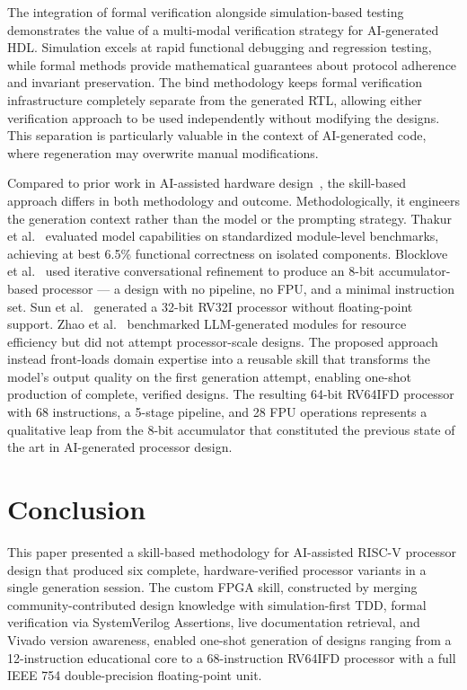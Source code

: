 \documentclass[journal]{IEEEtran}
\begin{document}
The integration of formal verification alongside simulation-based testing demonstrates the value of a multi-modal verification strategy for AI-generated HDL. Simulation excels at rapid functional debugging and regression testing, while formal methods provide mathematical guarantees about protocol adherence and invariant preservation. The bind methodology keeps formal verification infrastructure completely separate from the generated RTL, allowing either verification approach to be used independently without modifying the designs. This separation is particularly valuable in the context of AI-generated code, where regeneration may overwrite manual modifications.

Compared to prior work in AI-assisted hardware design~\cite{thakur2023date, blocklove2023chipchat, pearce2020dave, sun2024hdlgen, zhao2025resbench}, the skill-based approach differs in both methodology and outcome. Methodologically, it engineers the generation context rather than the model or the prompting strategy. Thakur et al.~\cite{thakur2023date} evaluated model capabilities on standardized module-level benchmarks, achieving at best 6.5\% functional correctness on isolated components. Blocklove et al.~\cite{blocklove2023chipchat} used iterative conversational refinement to produce an 8-bit accumulator-based processor --- a design with no pipeline, no FPU, and a minimal instruction set. Sun et al.~\cite{sun2024hdlgen} generated a 32-bit RV32I processor without floating-point support. Zhao et al.~\cite{zhao2025resbench} benchmarked LLM-generated modules for resource efficiency but did not attempt processor-scale designs. The proposed approach instead front-loads domain expertise into a reusable skill that transforms the model's output quality on the first generation attempt, enabling one-shot production of complete, verified designs. The resulting 64-bit RV64IFD processor with 68 instructions, a 5-stage pipeline, and 28 FPU operations represents a qualitative leap from the 8-bit accumulator that constituted the previous state of the art in AI-generated processor design.

\section{Conclusion}

This paper presented a skill-based methodology for AI-assisted RISC-V processor design that produced six complete, hardware-verified processor variants in a single generation session. The custom FPGA skill, constructed by merging community-contributed design knowledge with simulation-first TDD, formal verification via SystemVerilog Assertions, live documentation retrieval, and Vivado version awareness, enabled one-shot generation of designs ranging from a 12-instruction educational core to a 68-instruction RV64IFD processor with a full IEEE 754 double-precision floating-point unit.
\end{document}
